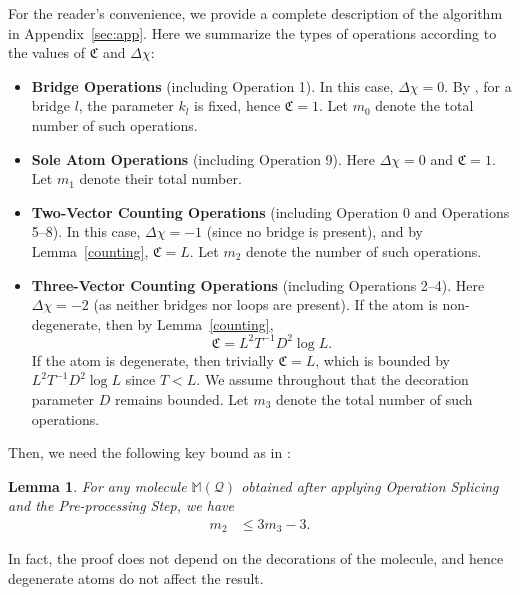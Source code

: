 \documentclass[UTF-8,reqno]{amsart}
\numberwithin{equation}{section}
\newtheorem{lemma}[theorem]{Lemma}
\theoremstyle{definition}
\def\leq{\leqslant}
\def\leq{\leqslant}
\begin{document}
For the reader’s convenience, we provide a complete description of the algorithm 
in Appendix~\ref{sec:app}. 
Here we summarize the types of operations according to the values of 
$\mathfrak{C}$ and $\Delta \chi$:
\begin{itemize}
    \item \textbf{Bridge Operations} (including Operation 1). 
    In this case, $\Delta \chi = 0$. 
    By \cite[Lemma 9.14]{DH23a}, for a bridge $l$, the parameter $k_l$ is fixed, 
    hence $\mathfrak{C} = 1$. 
    Let $m_0$ denote the total number of such operations.
    
    \item \textbf{Sole Atom Operations} (including Operation 9). 
    Here $\Delta \chi = 0$ and $\mathfrak{C} = 1$. 
    Let $m_1$ denote their total number.
    
    \item \textbf{Two-Vector Counting Operations} (including Operation 0 and Operations 5--8). 
    In this case, $\Delta \chi = -1$ (since no bridge is present), 
    and by Lemma~\ref{counting}, $\mathfrak{C} = L$. 
    Let $m_2$ denote the number of such operations.
    
    \item \textbf{Three-Vector Counting Operations} (including Operations 2--4). 
    Here $\Delta \chi = -2$ (as neither bridges nor loops are present). 
    If the atom is non-degenerate, then by Lemma~\ref{counting},
    \[
    \mathfrak{C} = L^{2}T^{-1}D^2 \log L.
    \]
    If the atom is degenerate, then trivially $\mathfrak{C} = L$, 
    which is bounded by $L^{2}T^{-1}D^2 \log L$ since $T < L$. 
    We assume throughout that the decoration parameter $D$ remains bounded. 
    Let $m_3$ denote the total number of such operations.
\end{itemize}


Then,  we need the following key bound  as in \cite[Proposition 7.6]{Vas24}:

\begin{lemma}
  For any molecule $\mathbb{M}(\mathcal{Q})$ obtained after applying  Operation Splicing 
and the  Pre-processing Step,  we have
  \begin{align}\label{prop-op-bound}
    m_2 &\leq 3m_3 -3.
\end{align}
\end{lemma}In fact, the proof does not depend on the decorations of the molecule, 
and hence degenerate atoms do not affect the result.
\end{document}
